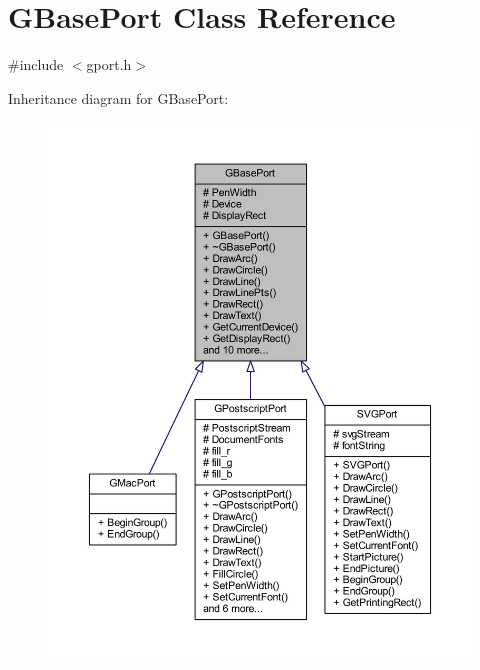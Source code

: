 \hypertarget{class_g_base_port}{}\section{G\+Base\+Port Class Reference}
\label{class_g_base_port}


{\ttfamily \#include $<$gport.\+h$>$}



Inheritance diagram for G\+Base\+Port\+:\nopagebreak
\begin{figure}[H]
\begin{center}
\leavevmode
\includegraphics[width=350pt]{class_g_base_port__inherit__graph}
\end{center}
\end{figure}


